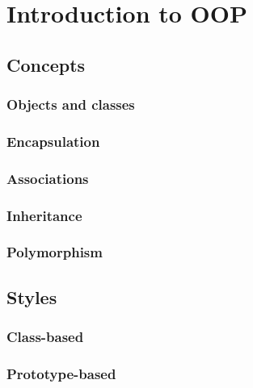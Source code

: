 \documentclass[12pt]{book}
\begin{document}
	\chapter{Introduction to OOP}
\fi


\section{Concepts}

\subsection{Objects and classes}

\subsection{Encapsulation}

\subsection{Associations}

\subsection{Inheritance}

\subsection{Polymorphism}

\section{Styles}

\subsection{Class-based}

\subsection{Prototype-based}

\ifx\wholebook\relax\else
% 
% 
	
\end{document}
